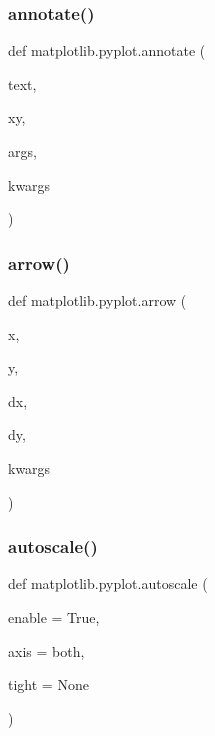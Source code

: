 \mbox{\label{namespacematplotlib_1_1pyplot_a3c57735562857fc6b0e39bf090b8e8ff}} 
\subsubsection{\texorpdfstring{annotate()}{annotate()}}
{\footnotesize\ttfamily def matplotlib.\+pyplot.\+annotate (\begin{DoxyParamCaption}\item[{}]{text,  }\item[{}]{xy,  }\item[{}]{args,  }\item[{}]{kwargs }\end{DoxyParamCaption})}

\mbox{\label{namespacematplotlib_1_1pyplot_a265ecaf792cced19e2fd03939cdf2dba}} 
\subsubsection{\texorpdfstring{arrow()}{arrow()}}
{\footnotesize\ttfamily def matplotlib.\+pyplot.\+arrow (\begin{DoxyParamCaption}\item[{}]{x,  }\item[{}]{y,  }\item[{}]{dx,  }\item[{}]{dy,  }\item[{}]{kwargs }\end{DoxyParamCaption})}

\mbox{\label{namespacematplotlib_1_1pyplot_a0901c2890ad4ba4aa1da22393a7ade14}} 
\subsubsection{\texorpdfstring{autoscale()}{autoscale()}}
{\footnotesize\ttfamily def matplotlib.\+pyplot.\+autoscale (\begin{DoxyParamCaption}\item[{}]{enable = {\ttfamily True},  }\item[{}]{axis = {\ttfamily \textquotesingle{}both\textquotesingle{}},  }\item[{}]{tight = {\ttfamily None} }\end{DoxyParamCaption})}

